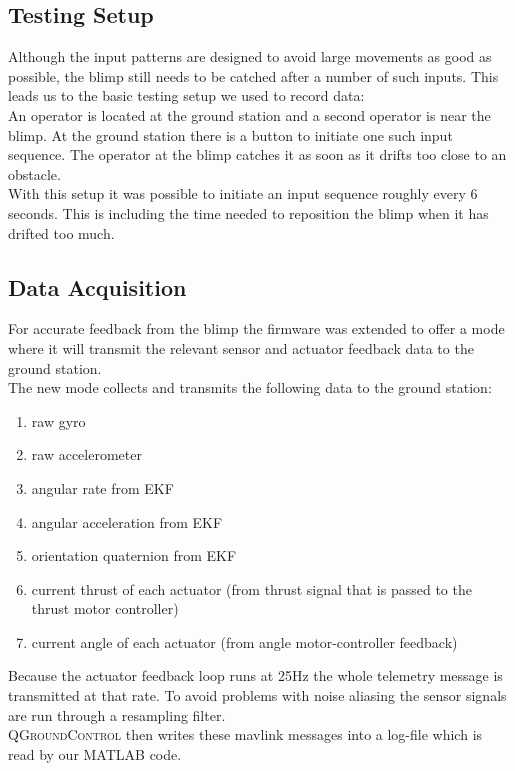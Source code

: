 \subsection{Testing Setup}
\label{sub:testing_setup}
Although the input patterns are designed to avoid large movements as good as possible, the blimp still needs to be catched after a number of such inputs. This leads us to the basic testing setup we used to record data: \\

An operator is located at the ground station and a second operator is near the blimp.
At the ground station there is a button to initiate one such input sequence.
The operator at the blimp catches it as soon as it drifts too close to an obstacle. \\
With this setup it was possible to initiate an input sequence roughly every 6 seconds. 
This is including the time needed to reposition the blimp when it has drifted too much.

\subsection{Data Acquisition}
\label{sub:data_acquisition}
For accurate feedback from the blimp the firmware was extended to offer a mode where it will transmit the relevant sensor and actuator feedback data to the ground station. \\
The new mode collects and transmits the following data to the ground station:
\begin{enumerate}
\item raw gyro
\item raw accelerometer
\item angular rate from EKF
\item angular acceleration from EKF
\item orientation quaternion from EKF
\item current thrust of each actuator (from thrust signal that is passed to the thrust motor controller)
\item current angle of each actuator (from angle motor-controller feedback)
\end{enumerate}
Because the actuator feedback loop runs at 25Hz the whole telemetry message is transmitted at that rate.
To avoid problems with noise aliasing the sensor signals are run through a resampling filter. \\
\textsc{QGroundControl} then writes these mavlink messages into a log-file which is read by our \textsc{MATLAB} code.

